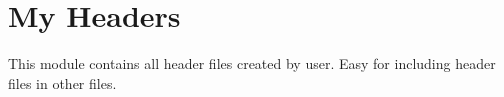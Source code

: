 \hypertarget{group___my_headers}{\section{My Headers}
\label{group___my_headers}
}
This module contains all header files created by user. Easy for including header files in other files. 